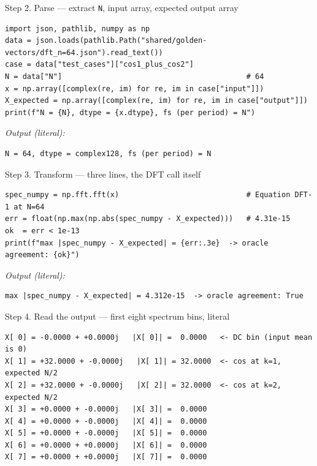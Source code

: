 \documentclass[11pt,a4paper,openany]{book}
\begin{document}
\begin{pipelinestep}{Step 2. Parse --- extract \texttt{N}, input array, expected output array}
\begin{lstlisting}[style=shadpython]
import json, pathlib, numpy as np
data = json.loads(pathlib.Path("shared/golden-vectors/dft_n=64.json").read_text())
case = data["test_cases"]["cos1_plus_cos2"]
N = data["N"]                                          # 64
x = np.array([complex(re, im) for re, im in case["input"]])
X_expected = np.array([complex(re, im) for re, im in case["output"]])
print(f"N = {N}, dtype = {x.dtype}, fs (per period) = N")
\end{lstlisting}
\textit{Output (literal):}
\begin{lstlisting}[style=shaddata]
N = 64, dtype = complex128, fs (per period) = N
\end{lstlisting}
\end{pipelinestep}

\begin{pipelinestep}{Step 3. Transform --- three lines, the DFT call itself}
\begin{lstlisting}[style=shadpython]
spec_numpy = np.fft.fft(x)                             # Equation DFT-1 at N=64
err = float(np.max(np.abs(spec_numpy - X_expected)))   # 4.31e-15
ok  = err < 1e-13
print(f"max |spec_numpy - X_expected| = {err:.3e}  -> oracle agreement: {ok}")
\end{lstlisting}
\textit{Output (literal):}
\begin{lstlisting}[style=shaddata]
max |spec_numpy - X_expected| = 4.312e-15  -> oracle agreement: True
\end{lstlisting}
\end{pipelinestep}

\begin{pipelinestep}{Step 4. Read the output --- first eight spectrum bins, literal}
\begin{lstlisting}[style=shaddata]
X[ 0] = -0.0000 + +0.0000j   |X[ 0]| =  0.0000   <- DC bin (input mean is 0)
X[ 1] = +32.0000 + -0.0000j   |X[ 1]| = 32.0000  <- cos at k=1, expected N/2
X[ 2] = +32.0000 + -0.0000j   |X[ 2]| = 32.0000  <- cos at k=2, expected N/2
X[ 3] = +0.0000 + -0.0000j   |X[ 3]| =  0.0000
X[ 4] = +0.0000 + -0.0000j   |X[ 4]| =  0.0000
X[ 5] = +0.0000 + -0.0000j   |X[ 5]| =  0.0000
X[ 6] = +0.0000 + +0.0000j   |X[ 6]| =  0.0000
X[ 7] = +0.0000 + +0.0000j   |X[ 7]| =  0.0000
\end{lstlisting}
\end{pipelinestep}
\end{document}
